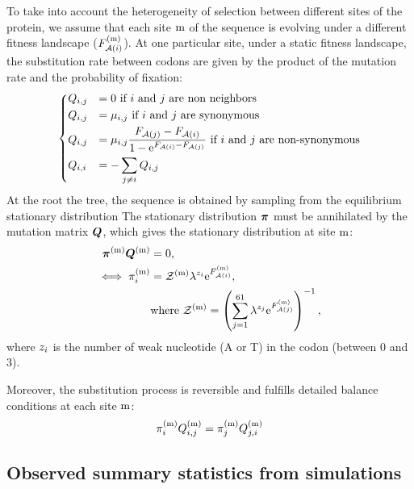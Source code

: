 To take into account the heterogeneity of selection between different sites of the protein, we assume that each site $\text{m}$ of the sequence is evolving under a different fitness landscape ($F_{\mathcal{A}({i})}^{(\text{m})}$).
At one particular site, under a static fitness landscape, the \gls{substitution} rate between \glspl{codon} are given by the product of the mutation rate and the probability of fixation:
\begin{equation}
    \begin{dcases}
        Q_{{i}, {j}} & = 0 \text{ if ${i}$ and ${j}$ are non neighbors} \\
        Q_{{i}, {j}} & = \mu_{{i}, {j}} \text{ if ${i}$ and ${j}$ are synonymous} \\
        Q_{{i}, {j}} & = \mu_{{i}, {j}} \dfrac{F_{\mathcal{A}({j})} - F_{\mathcal{A}({i})}}{1 - \mathrm{e}^{F_{\mathcal{A}({i})} - F_{\mathcal{A}({j})}} } \text{ if ${i}$ and ${j}$ are non-synonymous} \\
        Q_{{i}, {i}} & = - \sum\limits_{{j} \neq {i}} Q_{{i}, {j}}
    \end{dcases}
    \label{codonSubRates}
\end{equation}
At the root the tree, the sequence is obtained by sampling from the equilibrium stationary distribution
The stationary distribution $\bm{\pi}$ must be annihilated by the mutation matrix $\bm{Q}$, which gives the stationary distribution at site $\text{m}$:
\begin{align}
    \bm{\pi}^{(\text{m})} \bm{Q}^{(\text{m})}
    & = 0 ,\\
    \iff \pi_{{i}}^{(\text{m})}
    & = \mathcal{Z}^{(\text{m})} \lambda^{{z}_{{i}}} \mathrm{e}^{F_{\mathcal{A}({i})}^{(\text{m})}},\\
    & \mathrm{ where } \ \mathcal{Z}^{(\text{m})} = \left( \sum\limits_{{j}=1}^{61} \lambda^{{z}_{{j}}} \mathrm{e}^{F_{\mathcal{A}({j})}^{(\text{m})}} \right)^{-1},
    \label{codonStationarity}
\end{align}
where ${z}_{{i}}$ is the number of weak nucleotide (A or T) in the \gls{codon} (between 0 and 3).

Moreover, the \gls{substitution} process is reversible and fulfills detailed balance conditions at each site $\text{m}$:
\begin{align}
    \pi_{{i}}^{(\text{m})} Q_{{i}, {j}}^{(\text{m})} = \pi_{{j}}^{(\text{m})} Q_{{j}, {i}}^{(\text{m})}
    \label{codonSubBalance}
\end{align}

\subsection{Observed summary statistics from simulations}
\label{subsec:summary-statistics}

